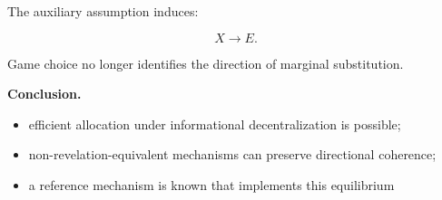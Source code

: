 \documentclass[11pt]{article}
\begin{document}
The auxiliary assumption induces:

\[
X \rightarrow E.
\]

\vspace{0.20cm}

Game choice no longer identifies the direction of marginal substitution.

\vspace{0.35cm}

{\large\bfseries
Conclusion.
}

\begin{itemize}

\item efficient allocation under informational decentralization is possible;

\item non-revelation-equivalent mechanisms can preserve directional coherence;

\item a reference mechanism is known that implements this equilibrium

\end{itemize}
\end{document}
